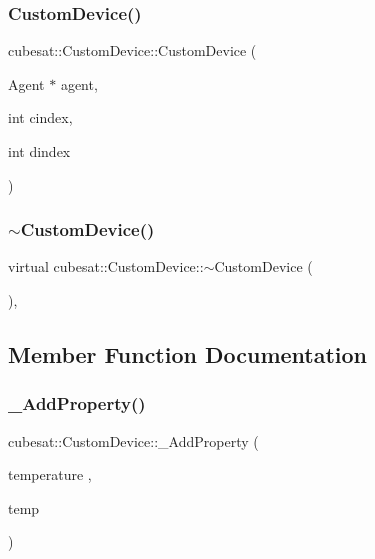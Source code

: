 \subsubsection{\texorpdfstring{Custom\+Device()}{CustomDevice()}}
{\footnotesize\ttfamily cubesat\+::\+Custom\+Device\+::\+Custom\+Device (\begin{DoxyParamCaption}\item[{Agent $\ast$}]{agent,  }\item[{int}]{cindex,  }\item[{int}]{dindex }\end{DoxyParamCaption})\hspace{0.3cm}{\ttfamily [inline]}}

\mbox{\label{classcubesat_1_1CustomDevice_afd2d3db110cc3c67a635f2cdf76db81e}} 
\subsubsection{\texorpdfstring{$\sim$\+Custom\+Device()}{~CustomDevice()}}
{\footnotesize\ttfamily virtual cubesat\+::\+Custom\+Device\+::$\sim$\+Custom\+Device (\begin{DoxyParamCaption}{ }\end{DoxyParamCaption})\hspace{0.3cm}{\ttfamily [inline]}, {\ttfamily [virtual]}}



\subsection{Member Function Documentation}
\mbox{\label{classcubesat_1_1CustomDevice_a2db96c92e03c4f4217e0217764fd4147}} 
\subsubsection{\texorpdfstring{\+\_\+\+Add\+Property()}{\_AddProperty()}\hspace{0.1cm}{\footnotesize\ttfamily [1/6]}}
{\footnotesize\ttfamily cubesat\+::\+Custom\+Device\+::\+\_\+\+Add\+Property (\begin{DoxyParamCaption}\item[{temperature}]{,  }\item[{temp}]{ }\end{DoxyParamCaption})}

